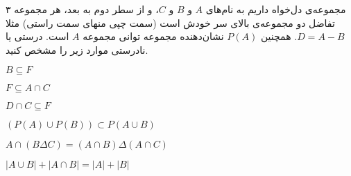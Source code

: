 ۳ مجموعه‌ی دل‌خواه داریم به نام‌های $A$ و $B$ و $C$، و از سطر دوم به بعد، هر مجموعه تفاضل دو مجموعه‌ی بالای سر خودش است (سمت چپی منهای سمت راستی) مثلا $D = A - B$. همچنین $P(A)$ نشان‌دهنده مجموعه توانی مجموعه $A$ است. درستی یا نادرستی موارد زیر را مشخص کنید.


 $B \subseteq F$

 $F \subseteq A \cap C$

 $D \cap C \subseteq F$

 $( P(A) \cup P(B) )\subset P(A \cup B)$

 $A \cap ( B \Delta C) = ( A \cap B) \Delta (A \cap C)$

 $| A \cup B | + | A \cap B | = |A| + |B|$

